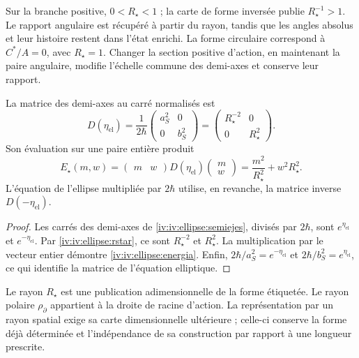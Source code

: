 Sur la branche positive, \(0<R_\star<1\) ; la carte de forme
inversée publie \(R_\star^{-1}>1\). Le rapport angulaire
est récupéré à partir du rayon, tandis que les angles absolus
et leur histoire restent dans l’état enrichi.
La forme circulaire correspond à \(C^*/A=0\), avec
\(R_\star=1\). Changer la section positive d’action,
en maintenant la paire angulaire, modifie l’échelle commune des
demi-axes et conserve leur rapport.

\begin{proposition}
\label{iv:iv:ellipse:matriz-prop}
La matrice des demi-axes au carré normalisés est
\begin{equation}
 D(\eta_{\mathrm{el}})
 =\frac1{2\hbar}
    \begin{pmatrix}a_S^2&0\\0&b_S^2\end{pmatrix}
 =\begin{pmatrix}R_\star^{-2}&0\\0&R_\star^2\end{pmatrix}.
 \label{iv:iv:ellipse:matriz}
\end{equation}
Son évaluation sur une paire entière produit
\begin{equation}
 E_\star(m,w)=
 \begin{pmatrix}m&w\end{pmatrix}
 D(\eta_{\mathrm{el}})
 \begin{pmatrix}m\\w\end{pmatrix}
 =\frac{m^2}{R_\star^2}+w^2R_\star^2.
 \label{iv:iv:ellipse:energia}
\end{equation}
L’équation de l’ellipse multipliée par \(2\hbar\)
utilise, en revanche, la matrice inverse \(D(-\eta_{\mathrm{el}})\).
\end{proposition}
\begin{proof}
Les carrés des demi-axes de
\eqref{iv:iv:ellipse:semiejes}, divisés par \(2\hbar\),
sont \(e^{\eta_{\mathrm{el}}}\) et
\(e^{-\eta_{\mathrm{el}}}\).
Par \eqref{iv:iv:ellipse:rstar}, ce sont
\(R_\star^{-2}\) et \(R_\star^2\).
La multiplication par le vecteur entier démontre
\eqref{iv:iv:ellipse:energia}. Enfin,
\(2\hbar/a_S^2=e^{-\eta_{\mathrm{el}}}\) et
\(2\hbar/b_S^2=e^{\eta_{\mathrm{el}}}\), ce qui
identifie la matrice de l’équation elliptique.
\end{proof}

Le rayon \(R_\star\) est une publication adimensionnelle de
la forme étiquetée. Le rayon polaire
\(\rho_{\partial}\) appartient à la droite de racine d’action.
La représentation par un rayon spatial exige sa carte
dimensionnelle ultérieure ; celle-ci conserve la forme déjà déterminée
et l’indépendance de sa construction par rapport à une
longueur prescrite.
